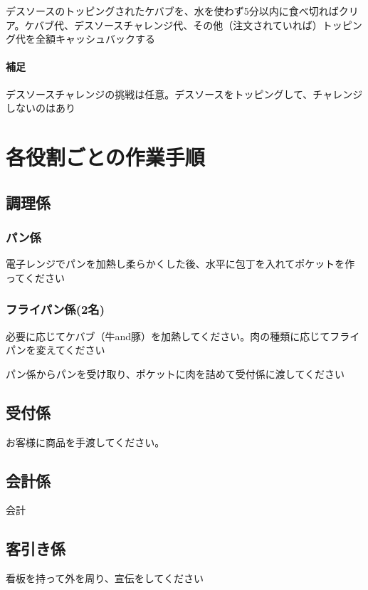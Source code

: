 \documentclass[10pt,a4paper]{jarticle}
\begin{document}
デスソースのトッピングされたケバブを、水を使わず5分以内に食べ切ればクリア。ケバブ代、デスソースチャレンジ代、その他（注文されていれば）トッピング代を全額キャッシュバックする

\paragraph{補足}
デスソースチャレンジの挑戦は任意。デスソースをトッピングして、チャレンジしないのはあり


\section{各役割ごとの作業手順}
\subsection{調理係}
\subsubsection{パン係}
電子レンジでパンを加熱し柔らかくした後、水平に包丁を入れてポケットを作ってください
\subsubsection{フライパン係(2名)}
必要に応じてケバブ（牛and豚）を加熱してください。肉の種類に応じてフライパンを変えてください

パン係からパンを受け取り、ポケットに肉を詰めて受付係に渡してください

\subsection{受付係}
お客様に商品を手渡してください。

\subsection{会計係}
会計

\subsection{客引き係}
看板を持って外を周り、宣伝をしてください
\end{document}
